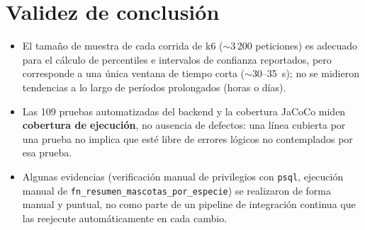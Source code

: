 \section{Validez de conclusi\'on}

\begin{itemize}[nosep]
  \item El tama\~no de muestra de cada corrida de k6 ($\sim$3\,200
    peticiones) es adecuado para el c\'alculo de percentiles e intervalos
    de confianza reportados, pero corresponde a una \'unica ventana de
    tiempo corta ($\sim$30--35~s); no se midieron tendencias a lo largo de
    per\'iodos prolongados (horas o d\'ias).
  \item Las 109 pruebas automatizadas del backend y la cobertura JaCoCo
    miden \textbf{cobertura de ejecuci\'on}, no ausencia de defectos: una
    l\'inea cubierta por una prueba no implica que est\'e libre de errores
    l\'ogicos no contemplados por esa prueba.
  \item Algunas evidencias (verificaci\'on manual de privilegios con
    \texttt{psql}, ejecuci\'on manual de \texttt{fn_resumen_mascotas_por_especie})
    se realizaron de forma manual y puntual, no como parte de un pipeline
    de integraci\'on continua que las reejecute autom\'aticamente en cada
    cambio.
\end{itemize}
